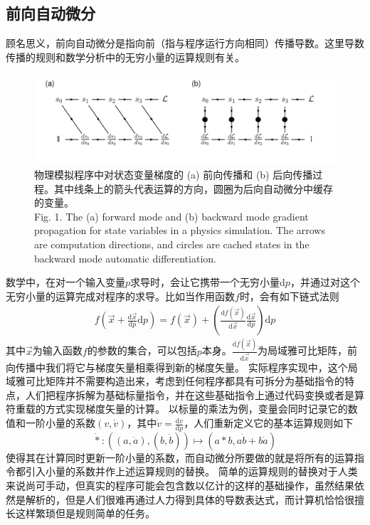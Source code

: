 \documentclass[A4,twoside,UTF8]{ctexart}
\def\D{\mathrm{d}}
\begin{document}
\subsection{前向自动微分}
    顾名思义，前向自动微分是指向前（指与程序运行方向相同）传播导数。这里导数传播的规则和数学分析中的无穷小量的运算规则有关。
    \begin{figure}
        \centering
        \includegraphics[width=0.9\columnwidth,trim={0 0cm 0 0},clip]{fig3.pdf}
        \caption{
            物理模拟程序中对状态变量梯度的 (a) 前向传播和 (b) 后向传播过程。其中线条上的箭头代表运算的方向，圆圈为后向自动微分中缓存的变量。\\
            Fig. 1. The (a) forward mode and (b) backward mode gradient propagation for state variables in a physics simulation. The arrows are computation directions, and circles are cached states in the backward mode automatic differentiation.
        }\label{fig:autodifftypes}
\end{figure}
数学中，在对一个输入变量$p$求导时，会让它携带一个无穷小量$\D p$，并通过对这个无穷小量的运算完成对程序的求导。比如当作用函数$f$时，会有如下链式法则
\begin{align}
    f\left(\vec x+ \frac{\D \vec x}{\D p} \D p\right) = f(\vec x) + \left(\frac{\D f(\vec x)}{\D \vec x}\frac{\D \vec x}{\D p}\right) \D p
\end{align}
其中$\vec x$为输入函数$f$的参数的集合，可以包括$p$本身。$\frac{\D f(\vec x)}{\D \vec x}$为局域雅可比矩阵，前向传播中我们将它与梯度矢量相乘得到新的梯度矢量。
实际程序实现中，这个局域雅可比矩阵并不需要构造出来，考虑到任何程序都具有可拆分为基础指令的特点，人们把程序拆解为基础标量指令，并在这些基础指令上通过代码变换或者是算符重载的方式实现梯度矢量的计算。
以标量的乘法为例，变量会同时记录它的数值和一阶小量的系数$(v, \dot v)$，其中$\dot v = \frac{\D v}{\D p}$，人们重新定义它的基本运算规则如下
$$\dot{*}: ((a, \dot a), (b, \dot b)) \mapsto (a * b, a \dot b + b \dot a)$$
使得其在计算同时更新一阶小量的系数，而自动微分所要做的就是将所有的运算指令都引入小量的系数并作上述运算规则的替换。
简单的运算规则的替换对于人类来说尚可手动，但真实的程序可能会包含数以亿计的这样的基础操作，虽然结果依然是解析的，但是人们很难再通过人力得到具体的导数表达式，而计算机恰恰很擅长这样繁琐但是规则简单的任务。
\end{document}
